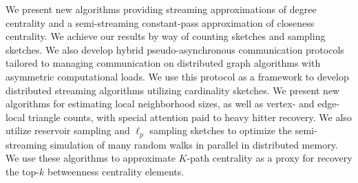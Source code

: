 \documentclass{report}
\begin{document}
We present new algorithms providing streaming approximations of degree centrality and a semi-streaming constant-pass approximation of closeness centrality.
We achieve our results by way of counting sketches and sampling sketches.
We also develop hybrid pseudo-asynchronous communication protocols tailored to managing communication on distributed graph algorithms with asymmetric computational loads.
We use this protocol as a framework to develop distributed streaming algorithms utilizing cardinality sketches.
We present new algorithms for estimating local neighborhood sizes, as well as vertex- and edge-local triangle counts, with special attention paid to heavy hitter recovery.
We also utilize reservoir sampling and $\ell_p$ sampling sketches to optimize the semi-streaming simulation of many random walks in parallel in distributed memory.
We use these algorithms to approximate  $K$-path centrality as a proxy for recovery the top-$k$ betweenness centrality elements.
\end{document}
